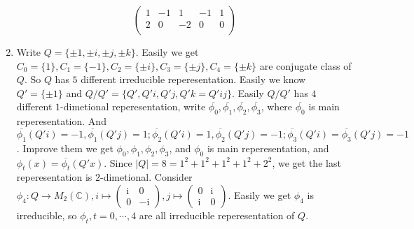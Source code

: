 \documentclass{ctexart}
\begin{document}
\begin{solution}
\begin{enumerate}
\[\begin{pmatrix}
              1 & -1 & 1  & -1 & 1  \\
              2 & 0  & -2 & 0  & 0  \\
            \end{pmatrix}
          \]
    \item
          Write \(Q=\{\pm 1,\pm i,\pm j,\pm k\}\). Easily we get \(C_0=\{1\},C_1=\{- 1\},C_2=\{\pm i\},C_3=\{\pm j\},C_4=\{\pm k\}\) are conjugate class of \(Q\).
          So \(Q\) has \(5\) different irreducible reperesentation.
          Easily we know \(Q'=\{\pm 1\}\) and \(Q / Q'=\{Q',Q'i,Q'j,Q'k=Q'ij\}\).
          Easily \(Q / Q'\) has \(4\) different \(1\)-dimetional reperesentation, write \(\overline{\phi_0},\overline{\phi_1},\overline{\phi_2},\overline{\phi_3}\), where \(\overline{\phi_0}\) is main reperesentation.
          And \(\overline{\phi_1}(Q'i)=-1,\overline{\phi_1}(Q'j)=1;\overline{\phi_2}(Q'i)=1,\overline{\phi_2}(Q'j)=-1;\overline{\phi_3}(Q'i)=\overline{\phi_3}(Q'j)=-1\).
          Improve them we get \(\phi_0,\phi_1,\phi_2,\phi_3\), and \(\phi_0\) is main reperesentation, and
          \(\phi_t(x)=\overline{\phi_t}(Q'x)\).
          Since \(|Q|=8=1^2+1^2+1^2+1^2+2^2\), we get the last reperesentation is \(2\)-dimetional.
          Consider \(\phi_4:Q \to M_2(\mathbb{C}),i \mapsto \begin{pmatrix}
            \mathrm{i} & 0           \\
            0          & -\mathrm{i}
          \end{pmatrix}, j \mapsto \begin{pmatrix}
            0          & \mathrm{i} \\
            \mathrm{i} & 0
          \end{pmatrix}\).
          Easily we get \(\phi_4\) is irreducible, so \(\phi_t,t=0,\cdots,4\) are all irreducible reperesentation of \(Q\).


\end{enumerate}
\end{solution}
\end{document}
